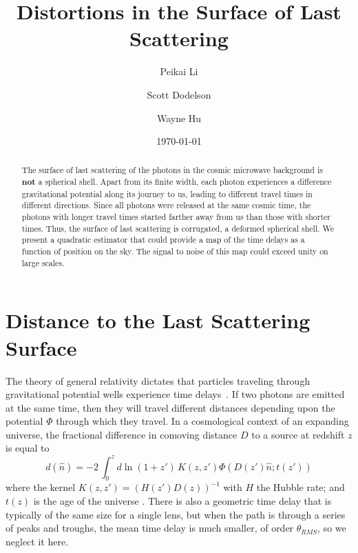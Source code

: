 \documentclass[prl,amsmath,amssymb,floatfix,superscriptaddress,nofootinbib,twocolumn]{revtex4-1}
\def\be{\begin{equation}}
\def\ee{\end{equation}}
\begin{document}
\title{Distortions in the Surface of Last Scattering}


\author{\large Peikai Li}
\author{\large Scott Dodelson}
\author{\large Wayne Hu}

\date{\today}

\begin{abstract}
The surface of last scattering of the photons in the cosmic microwave background is {\bf not} a spherical shell. Apart from its finite width, each photon experiences a difference gravitational potential along its journey to us, leading to different travel times in different directions. Since all photons were released at the same cosmic time, the photons with longer travel times started farther away from us than those with shorter times. Thus, the surface of last scattering is corrugated, a deformed spherical shell. We present a quadratic estimator that could provide a map of the time delays as a function of position on the sky. The signal to noise of this map could exceed unity on large scales.
\end{abstract}

\maketitle

\section{Distance to the Last Scattering Surface}
\newcommand\fd{d}

The theory of general relativity dictates that particles traveling through gravitational potential wells experience time delays~\cite{1964PhRvL..13..789S}. If two photons are emitted at the same time, then they will travel different distances depending upon the potential $\Phi$ through which they travel. In a cosmological context of an expanding universe, the fractional difference in comoving distance $D$ to a source at redshift $z$ is equal to  
\be
d(\hat n) = -2\, \int_0^{z} d\ln(1+z')\, K(z,z')\Phi\left(D(z')\hat n; t(z')\right)
\ee
where the kernel $K(z,z')=(H(z') D(z))^{-1}$ with $H$ the Hubble rate; and $t(z)$ is the age of the universe . There is also a geometric time delay that is typically of the same size for a single lens, but when the path is through a series of peaks and troughs, the mean time delay is much smaller, of order $\theta_{RMS}$, so we neglect it here. 
\end{document}
